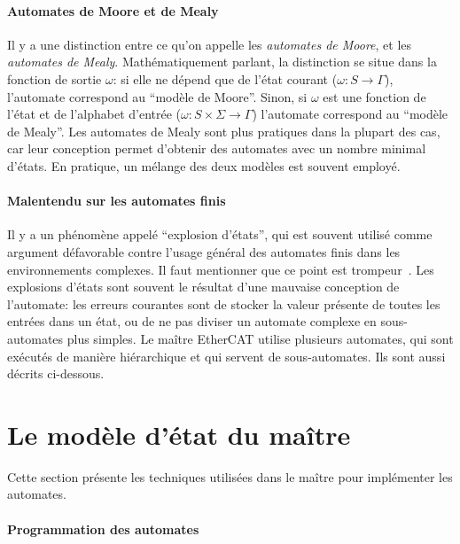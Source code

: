 \documentclass[a4paper,12pt,BCOR6mm,bibtotoc,idxtotoc]{scrbook}
\begin{document}
\paragraph{Automates de Moore et de Mealy}

Il y a une distinction entre ce qu'on appelle les \textit{automates de
  Moore}, et les \textit{automates de Mealy}.  Math\'ematiquement
parlant, la distinction se situe dans la fonction de sortie $\omega$:
si elle ne d\'epend que de l'\'etat courant ($\omega: S \rightarrow
\Gamma$), l'automate correspond au ``mod\`ele de Moore''. Sinon, si
$\omega$ est une fonction de l'\'etat et de l'alphabet d'entr\'ee
($\omega: S \times \Sigma \rightarrow \Gamma$) l'automate correspond
au ``mod\`ele de Mealy''. Les automates de Mealy sont plus
pratiques dans la plupart des cas, car leur conception permet d'obtenir
des automates avec un nombre minimal d'\'etats. En pratique, un m\'elange
des deux mod\`eles est souvent employ\'e.

\paragraph{Malentendu sur les automates finis}

Il y a un ph\'enom\`ene appel\'e ``explosion d'\'etats'', qui est souvent
utilis\'e comme argument d\'efavorable contre l'usage g\'en\'eral des
automates finis dans les environnements complexes. Il faut mentionner
que ce point est trompeur~\cite{fsmmis}.  Les explosions d'\'etats sont
souvent le r\'esultat d'une mauvaise conception de l'automate: les
erreurs courantes sont de stocker la valeur pr\'esente de toutes les
entr\'ees dans un \'etat, ou de ne pas diviser un automate complexe
en sous-automates plus simples.  Le ma\^itre EtherCAT utilise plusieurs
automates, qui sont ex\'ecut\'es de mani\`ere hi\'erarchique et qui
servent de sous-automates. Ils sont aussi d\'ecrits ci-dessous.



\section{Le mod\`ele d'\'etat du ma\^itre}
\label{sec:statemodel}

Cette section pr\'esente les techniques utilis\'ees dans le ma\^itre
pour impl\'ementer les automates.

\paragraph{Programmation des automates}
\end{document}
